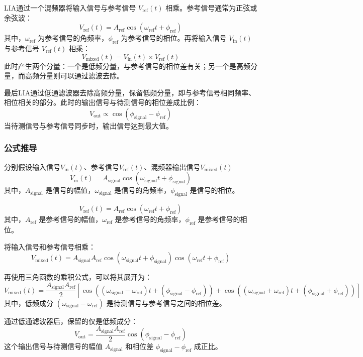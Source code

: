 \documentclass[dvipsnames, svgnames,a4paper,11pt]{article}
\begin{document}
			LIA通过一个混频器将输入信号与参考信号 \( V_{\text{ref}}(t) \) 相乘。参考信号通常为正弦或余弦波：
			\[
			V_{\text{ref}}(t) = A_{\text{ref}} \cos(\omega_{\text{ref}} t + \phi_{\text{ref}})
			\]
			其中，\( \omega_{\text{ref}} \) 为参考信号的角频率，\( \phi_{\text{ref}} \) 为参考信号的相位。再将输入信号 \( V_{\text{in}}(t) \) 与参考信号 \( V_{\text{ref}}(t) \) 相乘：
			\[
			V_{\text{mixed}}(t) = V_{\text{in}}(t) \times V_{\text{ref}}(t)
			\]
			此时产生两个分量：一个是低频分量，与参考信号的相位差有关；另一个是高频分量，而高频分量则可以通过滤波去除。
			
			最后LIA通过低通滤波器去除高频分量，保留低频分量，即与参考信号相同频率、相位相关的部分。此时的输出信号与待测信号的相位差成比例：
			\[
			V_{\text{out}} \propto \cos(\phi_{\text{signal}} - \phi_{\text{ref}})
			\]
			当待测信号与参考信号同步时，输出信号达到最大值。

		\subsubsection{公式推导}

		分别假设输入信号$V_{\text{in}}(t) $、参考信号$V_{\text{ref}}(t) $、混频器输出信号$V_{\text{mixed}}(t)$
		\[
		V_{\text{in}}(t) = A_{\text{signal}} \cos(\omega_{\text{signal}} t + \phi_{\text{signal}})
		\]
		其中，\( A_{\text{signal}} \) 是信号的幅值，\( \omega_{\text{signal}} \) 是信号的角频率，\( \phi_{\text{signal}} \) 是信号的相位。

		\[
		V_{\text{ref}}(t) = A_{\text{ref}} \cos(\omega_{\text{ref}} t + \phi_{\text{ref}})
		\]
		其中，\( A_{\text{ref}} \) 是参考信号的幅值，\( \omega_{\text{ref}} \) 是参考信号的角频率，\( \phi_{\text{ref}} \) 是参考信号的相位。

		将输入信号和参考信号相乘：
		\[
		V_{\text{mixed}}(t) = A_{\text{signal}} A_{\text{ref}} \cos(\omega_{\text{signal}} t + \phi_{\text{signal}}) \cos(\omega_{\text{ref}} t + \phi_{\text{ref}})
		\]
		
		再使用三角函数的乘积公式，可以将其展开为：
		\[
		V_{\text{mixed}}(t) = \frac{A_{\text{signal}} A_{\text{ref}}}{2} \left[ \cos((\omega_{\text{signal}} - \omega_{\text{ref}}) t + (\phi_{\text{signal}} - \phi_{\text{ref}})) + \cos((\omega_{\text{signal}} + \omega_{\text{ref}}) t + (\phi_{\text{signal}} + \phi_{\text{ref}})) \right]
		\]
		其中，低频成分 \( (\omega_{\text{signal}} - \omega_{\text{ref}}) \) 是待测信号与参考信号之间的相位差。

		通过低通滤波器后，保留的仅是低频成分：
		\[
		V_{\text{out}} = \frac{A_{\text{signal}} A_{\text{ref}}}{2} \cos(\phi_{\text{signal}} - \phi_{\text{ref}})
		\]
		这个输出信号与待测信号的幅值 \( A_{\text{signal}} \) 和相位差 \( \phi_{\text{signal}} - \phi_{\text{ref}} \) 成正比。
\end{document}
